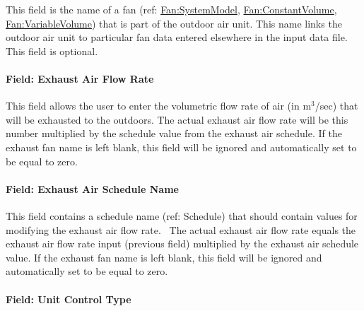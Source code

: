 This field is the name of a fan (ref: \hyperref[fansystemmodel]{Fan:SystemModel}, \hyperref[fanconstantvolume]{Fan:ConstantVolume}, \hyperref[fanvariablevolume]{Fan:VariableVolume}) that is part of the outdoor air unit. This name links the outdoor air unit to particular fan data entered elsewhere in the input data file. This field is optional.

\paragraph{Field: Exhaust Air Flow Rate}\label{field-exhaust-air-flow-rate}

This field allows the user to enter the volumetric flow rate of air (in m\(^{3}\)/sec) that will be exhausted to the outdoors. The actual exhaust air flow rate will be this number multiplied by the schedule value from the exhaust air schedule. If the exhaust fan name is left blank, this field will be ignored and automatically set to be equal to zero.

\paragraph{Field: Exhaust Air Schedule Name}\label{field-exhaust-air-schedule-name}

This field contains a schedule name (ref: Schedule) that should contain values for modifying the exhaust air flow rate.~ The actual exhaust air flow rate equals the exhaust air flow rate input (previous field) multiplied by the exhaust air schedule value. If the exhaust fan name is left blank, this field will be ignored and automatically set to be equal to zero.

\paragraph{Field: Unit Control Type}\label{field-unit-control-type}

